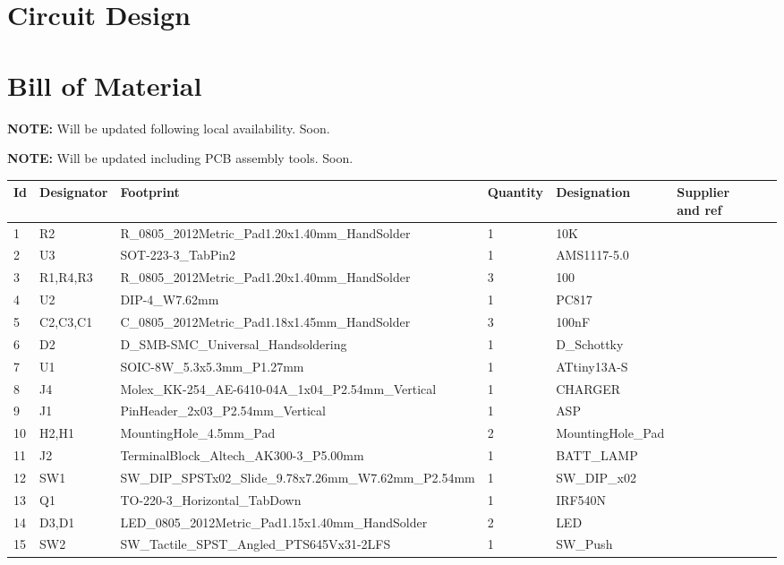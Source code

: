 \documentclass[a4paper,12pt,oneside,pdflatex,italian,final,twocolumn]{article}
\begin{document}
	\section{Circuit Design}
	
	
	
	
	
	\newpage
	\section{Bill of Material}
	
	\textbf{NOTE:} Will be updated following local availability. Soon.
	
	\textbf{NOTE:} Will be updated including PCB assembly tools. Soon.
	
	\begin{table}[!ht]
		\centering
		\begin{tabular}{|l|l|l|l|l|l|l|l|}
			\hline
			Id & Designator & Footprint & Quantity & Designation & Supplier and ref & ~ & ~ \\ \hline
			1 & R2 & R\_0805\_2012Metric\_Pad1.20x1.40mm\_HandSolder & 1 & 10K & ~ & ~ & ~ \\ \hline
			2 & U3 & SOT-223-3\_TabPin2 & 1 & AMS1117-5.0 & ~ & ~ & ~ \\ \hline
			3 & R1,R4,R3 & R\_0805\_2012Metric\_Pad1.20x1.40mm\_HandSolder & 3 & 100 & ~ & ~ & ~ \\ \hline
			4 & U2 & DIP-4\_W7.62mm & 1 & PC817 & ~ & ~ & ~ \\ \hline
			5 & C2,C3,C1 & C\_0805\_2012Metric\_Pad1.18x1.45mm\_HandSolder & 3 & 100nF & ~ & ~ & ~ \\ \hline
			6 & D2 & D\_SMB-SMC\_Universal\_Handsoldering & 1 & D\_Schottky & ~ & ~ & ~ \\ \hline
			7 & U1 & SOIC-8W\_5.3x5.3mm\_P1.27mm & 1 & ATtiny13A-S & ~ & ~ & ~ \\ \hline
			8 & J4 & Molex\_KK-254\_AE-6410-04A\_1x04\_P2.54mm\_Vertical & 1 & CHARGER & ~ & ~ & ~ \\ \hline
			9 & J1 & PinHeader\_2x03\_P2.54mm\_Vertical & 1 & ASP & ~ & ~ & ~ \\ \hline
			10 & H2,H1 & MountingHole\_4.5mm\_Pad & 2 & MountingHole\_Pad & ~ & ~ & ~ \\ \hline
			11 & J2 & TerminalBlock\_Altech\_AK300-3\_P5.00mm & 1 & BATT\_LAMP & ~ & ~ & ~ \\ \hline
			12 & SW1 & SW\_DIP\_SPSTx02\_Slide\_9.78x7.26mm\_W7.62mm\_P2.54mm & 1 & SW\_DIP\_x02 & ~ & ~ & ~ \\ \hline
			13 & Q1 & TO-220-3\_Horizontal\_TabDown & 1 & IRF540N & ~ & ~ & ~ \\ \hline
			14 & D3,D1 & LED\_0805\_2012Metric\_Pad1.15x1.40mm\_HandSolder & 2 & LED & ~ & ~ & ~ \\ \hline
			15 & SW2 & SW\_Tactile\_SPST\_Angled\_PTS645Vx31-2LFS & 1 & SW\_Push & ~ & ~ & ~ \\ \hline
		\end{tabular}
	\end{table}
\end{document}
